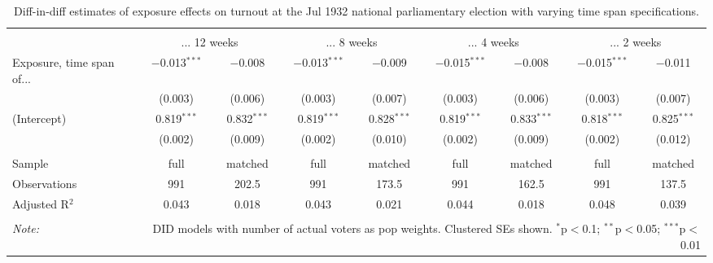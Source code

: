 
\begin{table}[!htbp] \centering 
  \caption{Diff-in-diff estimates of exposure effects on turnout at the Jul 1932 national parliamentary election with varying time span specifications.\vspace{-.25cm}} 
  \label{tab:turnout-timespan-dd-1932-1} 
\scriptsize 
\begin{tabular}{@{\extracolsep{5pt}}lcccccccc} 
\\[-1.8ex]\hline 
\hline \\[-1.8ex] 
 & \multicolumn{2}{c}{... 12 weeks} & \multicolumn{2}{c}{... 8 weeks} & \multicolumn{2}{c}{... 4 weeks} & \multicolumn{2}{c}{... 2 weeks} \\ 
 \cmidrule(r){2-3}\cmidrule(r){4-5}\cmidrule(r){6-7}\cmidrule(r){8-9}Exposure, time span of... & $-$0.013$^{***}$ & $-$0.008 & $-$0.013$^{***}$ & $-$0.009 & $-$0.015$^{***}$ & $-$0.008 & $-$0.015$^{***}$ & $-$0.011 \\ 
  & (0.003) & (0.006) & (0.003) & (0.007) & (0.003) & (0.006) & (0.003) & (0.007) \\ 
  (Intercept) & 0.819$^{***}$ & 0.832$^{***}$ & 0.819$^{***}$ & 0.828$^{***}$ & 0.819$^{***}$ & 0.833$^{***}$ & 0.818$^{***}$ & 0.825$^{***}$ \\ 
  & (0.002) & (0.009) & (0.002) & (0.010) & (0.002) & (0.009) & (0.002) & (0.012) \\ 
 \hline \\[-1.8ex] 
Sample & full & matched & full & matched & full & matched & full & matched \\ 
Observations & 991 & 202.5 & 991 & 173.5 & 991 & 162.5 & 991 & 137.5 \\ 
Adjusted R$^{2}$ & 0.043 & 0.018 & 0.043 & 0.021 & 0.044 & 0.018 & 0.048 & 0.039 \\ 
\hline 
\hline \\[-1.8ex] 
\textit{Note:}  & \multicolumn{8}{r}{DID models with number of actual voters as pop weights. Clustered SEs shown. $^{*}$p$<$0.1; $^{**}$p$<$0.05; $^{***}$p$<$0.01} \\ 
\end{tabular} 
\end{table} 
